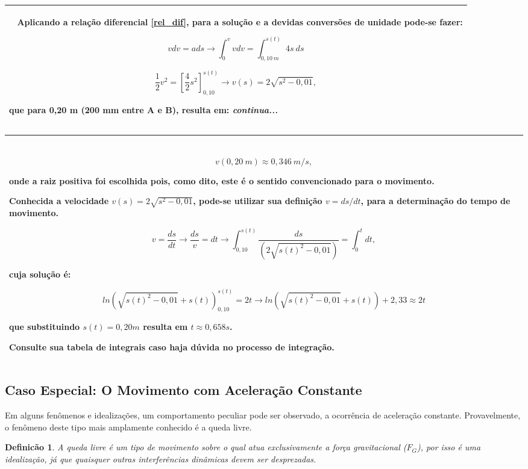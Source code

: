 \documentclass[a4paper, 11pt]{report}
\newtheorem{mydef}{Definicão}
\newenvironment{myboxed}
    {
        \begin{center}
        \begin{tabular}{p{0.7\textwidth}}
        \hline\
    }
    { 
        \\\hline
        \end{tabular} 
        \end{center}
    }
\begin{document}
\begin{myboxed}
    Aplicando a relação diferencial \ref{rel_dif}, para a solução e a devidas 
    conversões de unidade pode-se fazer:

    $$
    v dv = a ds 
    \rightarrow \int_0^{v} v dv = \int_{0,10 \: m}^{s(t)} {4s \: ds}
    $$

    $$
    \frac{1}{2} v^2 = \left[ \frac{4}{2} s^2 \right]_{0,10}^{s(t)} \rightarrow
    v(s) = 2\sqrt{s^2 - 0,01},
    $$

    que para 0,20 m (200 mm entre A e B), resulta em: \emph{continua...}
\end{myboxed}
\begin{myboxed}
    $$
    v(0,20 \: m) \approx 0,346 \: m/s,
    $$

    onde a raiz positiva foi escolhida pois, como dito, este é o sentido 
    convencionado para o movimento. 

    Conhecida a velocidade $v(s) = 2\sqrt{s^2 - 0,01}$, pode-se utilizar sua 
    definição $v = ds / dt$, para a determinação do tempo de movimento. 

    $$
    v = \frac{ds}{dt} \rightarrow \frac{ds}{v} =  dt \rightarrow 
    \int_{0,10}^{s(t)} \frac{ds}{(2\sqrt{s(t)^2 - 0,01})} = \int_0^t { dt},
    $$

    cuja solução é:

    $$
    ln(\sqrt{s(t)^2 - 0,01} + s(t))_{0,10}^{s(t)} = 2t \rightarrow
    ln(\sqrt{s(t)^2 - 0,01} + s(t)) + 2,33 \approx 2t
    $$
    
    que substituindo $s(t) = 0,20 m$ resulta em $t \approx 0,658 s$. 

    Consulte sua tabela de integrais caso haja dúvida no processo de integração.

    
\end{myboxed}

\subsection{Caso Especial: O Movimento com Aceleração Constante}

Em alguns fenômenos e idealizações, um comportamento peculiar pode ser
observado, a ocorrência de aceleração constante. Provavelmente, o fenômeno deste 
tipo mais amplamente conhecido é a queda livre.

\begin{mydef}
    A queda livre é um tipo de movimento sobre o qual atua exclusivamente a 
    força gravitacional ($F_G$), por isso é uma idealização, já que quaisquer
    outras interferências dinâmicas devem ser desprezadas. 
\end{mydef}
\end{document}
